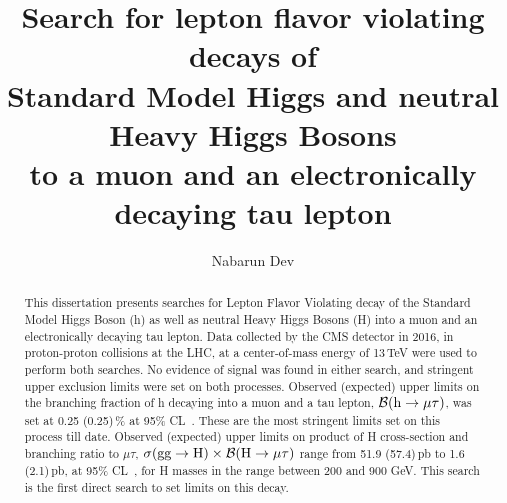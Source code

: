 \documentclass[final,numrefs,sort&compress]{nddiss2e}
\begin{document}
\newlength\cmsTabSkip
\setlength\cmsTabSkip{2ex}


\frontmatter %

\title{Search for lepton flavor violating decays of \protect\\ Standard Model Higgs and neutral Heavy Higgs Bosons \protect\\to a muon and an electronically decaying tau lepton}
\author{Nabarun Dev}

\maketitle
%
%

{} %
\makecopyright

\begin{abstract}
This dissertation presents searches for Lepton Flavor Violating decay of the Standard Model Higgs Boson (h) as well as neutral Heavy Higgs Bosons (H) into a muon and an electronically decaying tau lepton. Data collected by the CMS detector in 2016, in proton-proton collisions at the LHC, at a center-of-mass energy of 13\,TeV were used to perform both searches. No evidence of signal was found in either search, and stringent upper exclusion limits were set on both processes. Observed (expected) upper limits on the branching fraction of h decaying into a muon and a tau lepton, $\mathcal{B}(\text{h} \to \mu \tau)$, was set at 0.25 (0.25)\,\% at 95\% CL~\cite{HIG-17-001}. These are the most stringent limits set on this process till date. Observed (expected) upper limits on product of H cross-section and branching ratio to $\mu\tau$, $\sigma(\textrm{gg}\rightarrow \text{H})\times\mathcal{B}(\text{H} \to \mu \tau)$ range from 51.9 (57.4)\,pb to 1.6 (2.1)\,pb, at 95\% CL~\cite{HIG-18-017}, for H masses in the range between 200 and 900 GeV. This search is the first direct search to set limits on this decay.
  
\end{abstract}
\end{document}
